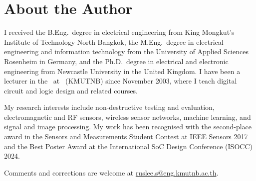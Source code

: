 \chapter*{About the Author}

I received the B.Eng.\ degree in electrical engineering from King Mongkut's Institute of Technology North Bangkok, the M.Eng.\ degree in electrical engineering and information technology from the University of Applied Sciences Rosenheim in Germany, and the Ph.D.\ degree in electrical and electronic engineering from Newcastle University in the United Kingdom.
I have been a lecturer in the \AuthorDept\ at \AuthorUni\ (KMUTNB) since November 2003, where I teach digital circuit and logic design and related courses.

My research interests include non-destructive testing and evaluation, electromagnetic and RF sensors, wireless sensor networks, machine learning, and signal and image processing. My work has been recognised with the second-place award in the Sensors and Measurements Student Contest at IEEE Sensors 2017 and the Best Poster Award at the International SoC Design Conference (ISOCC) 2024.

Comments and corrections are welcome at \href{mailto:ruslee.s@eng.kmutnb.ac.th}{ruslee.s@eng.kmutnb.ac.th}.

\begin{flushright}\AuthorFull\end{flushright}
\clearpage
